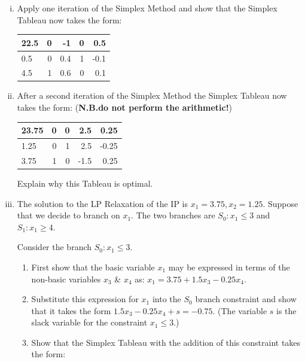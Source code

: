 \documentclass[12pt]{article}
\begin{document}
\begin{itemize}
			\begin{enumerate}[(i)]
				\item Apply one iteration of the Simplex Method and show that the  Simplex Tableau now takes the form:
				\begin{center}
					\begin{tabular}[h]{|l|rrrr|}\hline
						22.5&0&-1&0&0.5\\\hline
						0.5&0&0.4&1&-0.1\\
						4.5&1&0.6&0&0.1\\\hline
					\end{tabular}
				\end{center}
				\item After a second iteration of  the Simplex Method the  Simplex Tableau now takes the form: ({\bf N.B.do not perform the arithmetic!})
				\begin{center}
					\begin{tabular}[h]{|l|rrrr|}\hline
						23.75     &        0            & 0&          2.5&          0.25\\\hline
						1.25&             0&          1&          2.5&         -0.25\\
						3.75&          1&             0&         -1.5&          0.25\\\hline
					\end{tabular}
				\end{center}
				Explain why this Tableau is optimal.
				\item The solution to the LP Relaxation of the IP is $x_1=3.75, x_2=1.25$. 		
				Suppose that we decide to branch on $x_1$. The two branches are $S_0: x_1 \le 3$ and $S_1: x_1 \ge 4$. 
				
				\medskip Consider the branch  $S_0: x_1 \le 3$.
				\begin{enumerate}
					\item First show that the basic variable $x_1$ may be expressed in terms of the non-basic variables $x_3$ \& $x_4$ as: $x_1 =3.75+1.5 x_3 -0.25 x_4$.
					\item Substitute this expression for $x_1$ into the $S_0$ branch constraint and show that it takes the form $1.5 x_3-0.25 x_4 +s=-0.75$. (The variable $s$ is the slack variable for the constraint $x_1 \le 3$.)
					\item Show that the  Simplex Tableau with the addition of this constraint takes the form:
					\vspace{10pt}
					

\end{enumerate}
\end{enumerate}
\end{itemize}
\end{document}
